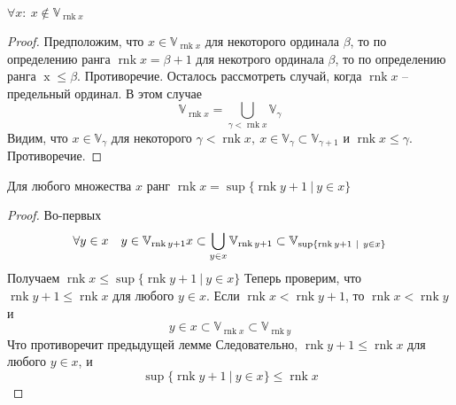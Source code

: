 \begin{lem}
$\forall x:\ x \notin \mathbb{V}_{\operatorname{rnk} x}$
\end{lem}

\begin{proof}
Предположим, что $x \in \mathbb{V}_{\operatorname{rnk} x}$ для некоторого ординала $\beta$, то по определению ранга $\operatorname{rnk} x = \beta + 1$ для некотрого ординала $\beta$, то по определению ранга $\operatorname{x} \leqslant \beta$. Противоречие.
\vskip 0.1in
Осталось рассмотреть случай, когда $\operatorname{rnk} x$ -- предельный ординал. В этом случае
$$
\mathbb{V}_{\operatorname{rnk} x} = \bigcup_{\gamma < \operatorname{rnk} x} \mathbb{V}_{\gamma}
$$
Видим, что $x \in \mathbb{V}_{\gamma}$ для некоторого $\gamma < \operatorname{rnk} x,\ x \in \mathbb{V}_{\gamma} \subset \mathbb{V}_{\gamma + 1}$ и $\operatorname{rnk} x \leqslant \gamma$. Противоречие.
\end{proof}

\begin{lem}
Для любого множества $x$ ранг $\operatorname{rnk} x = \sup\{\operatorname{rnk} y+1\ |\ y \in x\}$
\end{lem}

\begin{proof}
Во-первых
$$
\forall y \in x\quad y \in \mathbb{V}_{\operatorname{rnk} y+1}\\
x \subset \bigcup_{y \in x} \mathbb{V}_{\operatorname{rnk} y+1} \subset \mathbb{V}_{\sup\{\operatorname{rnk} y+1\ |\ y \in x\}}
$$
Получаем $\operatorname{rnk} x \leqslant \sup\{\operatorname{rnk} y+1\ |\ y \in x\}$
\vskip 0.1in
Теперь проверим, что $\operatorname{rnk} y+1 \leqslant \operatorname{rnk} x$ для любого $y \in x$. Если $\operatorname{rnk} x < \operatorname{rnk} y+1$, то $\operatorname{rnk} x < \operatorname{rnk} y$ и
$$
y \in x \subset \mathbb{V}_{\operatorname{rnk} x} \subset \mathbb{V}_{\operatorname{rnk} y}
$$
Что противоречит предыдущей лемме
\vskip 0.1in
Следовательно, $\operatorname{rnk} y+1 \leqslant \operatorname{rnk} x$ для любого $y \in x$, и
$$
\sup\{\operatorname{rnk} y+1\ |\ y \in x\} \leqslant \operatorname{rnk} x
$$
\end{proof}
